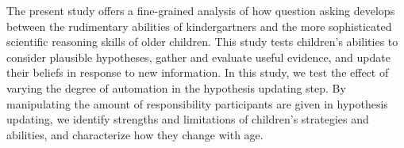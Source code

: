 \documentclass[10pt,letterpaper]{article}
\begin{document}


The present study offers a fine-grained analysis of how question asking develops between the rudimentary abilities of kindergartners and the more sophisticated scientific reasoning skills of older children. This study tests children's abilities to consider plausible hypotheses, gather and evaluate useful evidence, and update their beliefs in response to new information. In this study, we test the effect of varying the degree of automation in the hypothesis updating step. By manipulating the amount of responsibility participants are given in hypothesis updating, we identify strengths and limitations of children's strategies and abilities, and characterize how they change with age. 
\end{document}
